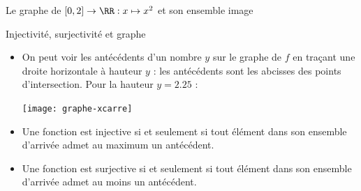 \documentclass[french,xcolor=svgnames]{beamer}
\begin{document}
\begin{frame}
  Le graphe de $[0,2] \to \RR : x \mapsto x^2$  et son ensemble image\pause
  \begin{center}
  \end{center}
\end{frame}



\begin{frame}{Injectivité, surjectivité et graphe}
  \begin{remark}
    \begin{itemize}
    \item On peut \og voir\fg{} les antécédents d'un nombre \(y\) sur le graphe de \(f\) en traçant une droite horizontale à hauteur \(y\)\pause{} : les antécédents sont les abcisses des points d'intersection.\pause{} Pour la hauteur \(y = 2.25\) :\pause{}
      \begin{center}
        \texttt{[image: graphe-xcarre]}
      \end{center}\pause{}
    \item Une fonction est injective si et seulement si\pause{} tout élément dans son ensemble d'arrivée admet au maximum un antécédent.\pause{}
    \item Une fonction est surjective si et seulement si\pause{} tout élément dans son ensemble d'arrivée admet au moins un antécédent.
    \end{itemize}
  \end{remark}
\end{frame}
\end{document}
